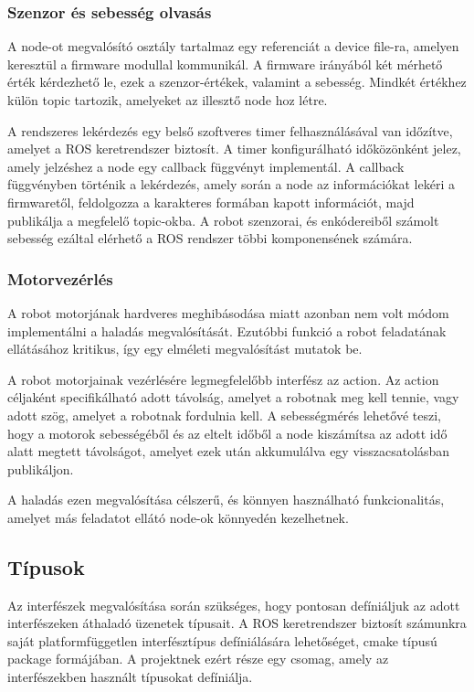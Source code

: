 \subsubsection{Szenzor és sebesség olvasás}
A node-ot megvalósító osztály tartalmaz egy referenciát a device file-ra, amelyen
keresztül a firmware modullal kommunikál. A firmware irányából két mérhető érték
kérdezhető le, ezek a szenzor-értékek, valamint a sebesség. Mindkét értékhez
külön topic tartozik, amelyeket az illesztő node hoz létre.

A rendszeres lekérdezés egy belső szoftveres timer felhasználásával van időzítve,
amelyet a ROS keretrendszer biztosít. A timer konfigurálható időközönként jelez,
amely jelzéshez a node egy callback függvényt implementál. A callback függvényben
történik a lekérdezés, amely során a node az információkat lekéri a firmwaretől,
feldolgozza a karakteres formában kapott információt, majd publikálja a megfelelő
topic-okba. A robot szenzorai, és enkódereiből számolt sebesség ezáltal elérhető
a ROS rendszer többi komponensének számára.

\subsubsection{Motorvezérlés}

A robot motorjának hardveres meghibásodása miatt azonban nem volt módom
implementálni a haladás megvalósítását. Ezutóbbi funkció a robot feladatának
ellátásához kritikus, így egy elméleti megvalósítást mutatok be.

A robot motorjainak vezérlésére legmegfelelőbb interfész az action.
Az action céljaként specifikálható adott távolság, amelyet a robotnak meg kell
tennie, vagy adott szög, amelyet a robotnak fordulnia kell. A sebességmérés
lehetővé teszi, hogy a motorok sebességéből és az eltelt időből a node kiszámítsa
az adott idő alatt megtett távolságot, amelyet ezek után akkumulálva egy
visszacsatolásban publikáljon.

A haladás ezen megvalósítása célszerű, és könnyen használható funkcionalitás,
amelyet más feladatot ellátó node-ok könnyedén kezelhetnek.

\subsection{Típusok}

Az interfészek megvalósítása során szükséges, hogy pontosan defíniáljuk az adott
interfészeken áthaladó üzenetek típusait. A ROS keretrendszer biztosít számunkra
saját platformfüggetlen interfésztípus defíniálására lehetőséget, cmake típusú
package formájában. A projektnek ezért része egy csomag, amely az interfészekben
használt típusokat defíniálja. 

